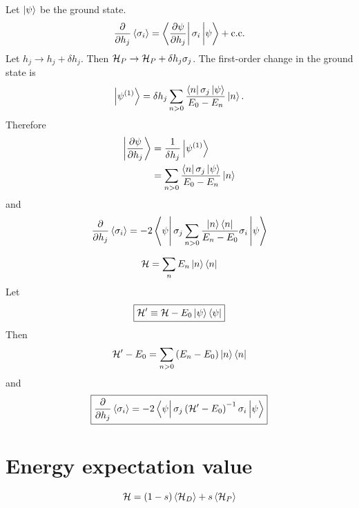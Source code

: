Let $\left| \psi \right>$ be the ground state.
\begin{equation}
  \pd{}{h_j} \avg{\sigma_i}
  = \matrixel{\pd{\psi}{h_j}}{\sigma_i}{\psi} + \cc
  \label{}
\end{equation}
Let
$h_j \rightarrow h_j + \delta h_j$.
Then
$\mathcal{H}_P \rightarrow \mathcal{H}_P + \delta h_j \sigma_j$.
The first-order change in the ground state is
\begin{equation}
  \ket{\psi^{(1)}}
  = \delta h_j \sum_{n>0} \frac{\matrixel{n}{\sigma_j}{\psi}}{E_0 - E_n} \ket{n}.
  \label{}
\end{equation}
Therefore
\begin{align}
  \ket{\pd{\psi}{h_j}}
  &= \frac{1}{\delta h_j} \ket{\psi^{(1)}} \\
  &= \sum_{n>0} \frac{\matrixel{n}{\sigma_j}{\psi}}{E_0 - E_n} \ket{n}
  \label{}
\end{align}
and
\begin{equation}
  \pd{}{h_j} \avg{\sigma_i}
  = -2 \matrixel{\psi} {\sigma_j \sum_{n>0} \frac{\ket{n} \bra{n}}{E_n - E_0} \sigma_i} {\psi}
  \label{}
\end{equation}

\begin{equation}
  \mathcal{H} = \sum_n E_n \left| n \right> \left< n \right|
  \label{}
\end{equation}
Let
\begin{equation}
  \boxed{
  \mathcal{H}^{\prime} \equiv \mathcal{H} - E_0 \left| \psi \right> \left< \psi \right|
  }
  \label{}
\end{equation}
Then
\begin{equation}
  \mathcal{H}^{\prime} - E_0 = \sum_{n>0} \left( E_n - E_0 \right) \left| n \right> \left< n \right|
  \label{}
\end{equation}
and
\begin{equation}
  \boxed{
  \pd{}{h_j} \avg{\sigma_i}
  = -2 \matrixel{\psi}{\sigma_j \left( \ham^{\prime} - E_0 \right)^{-1} \sigma_i}{\psi}
  }
  \label{}
\end{equation}

\section*{Energy expectation value}

\begin{equation}
  \mathcal{H} = (1 - s) \left< \mathcal{H}_D \right> + s \left< \mathcal{H}_P \right>
  \label{}
\end{equation}

